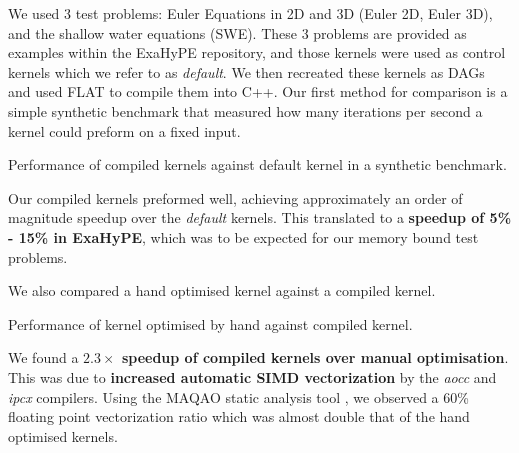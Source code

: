 We used 3 test problems: Euler Equations in 2D and 3D (Euler 2D, Euler 3D), and the shallow water equations (SWE).
These 3 problems are provided as examples within the ExaHyPE repository, and those kernels were used as control kernels which we refer to as \textit{default}.
We then recreated these kernels as DAGs and used FLAT to compile them into C++.
Our first method for comparison is a simple synthetic benchmark that measured how many iterations per second a kernel could preform on a fixed input.  

\begin{table}
    \centering
     
    \caption{Performance of compiled kernels against default kernel in a synthetic benchmark.} 
\end{table}

Our compiled kernels preformed well, achieving approximately an order of magnitude speedup over the \textit{default} kernels.
This translated to a \textbf{speedup of 5\% - 15\% in ExaHyPE}, which was to be expected for our memory bound test problems.

We also compared a hand optimised kernel against a compiled kernel. 
\begin{table}
    \centering
     
    \caption{Performance of kernel optimised by hand against compiled kernel.}
\end{table}

We found a \textbf{$2.3\times$ speedup of compiled kernels over manual optimisation}.
This was due to \textbf{increased automatic SIMD vectorization} by the \textit{aocc} and \textit{ipcx} compilers.
Using the MAQAO static analysis tool \cite{MAQAO}, we observed a 60\% floating point vectorization ratio which was almost double that of the hand optimised kernels.